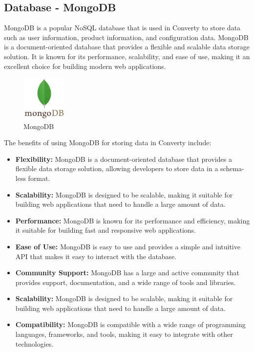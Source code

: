 \subsection{Database - MongoDB}
MongoDB is a popular NoSQL database that is used in Converty to store data such as user information, product information, and configuration data. MongoDB is a document-oriented database that provides a flexible and scalable data storage solution. It is known for its performance, scalability, and ease of use, making it an excellent choice for building modern web applications.

\begin{figure}[H]
    \centering
    \includegraphics[width=0.2\textwidth]{Images/mongodb2.png}
    \caption{MongoDB}
    \label{fig:mongodb}
\end{figure}

The benefits of using MongoDB for storing data in Converty include:

\begin{itemize}
    \item \textbf{Flexibility:} MongoDB is a document-oriented database that provides a flexible data storage solution, allowing developers to store data in a schema-less format.
    \item \textbf{Scalability:} MongoDB is designed to be scalable, making it suitable for building web applications that need to handle a large amount of data.
    \item \textbf{Performance:} MongoDB is known for its performance and efficiency, making it suitable for building fast and responsive web applications.
    \item \textbf{Ease of Use:} MongoDB is easy to use and provides a simple and intuitive API that makes it easy to interact with the database.
    \item \textbf{Community Support:} MongoDB has a large and active community that provides support, documentation, and a wide range of tools and libraries.
    \item \textbf{Scalability:} MongoDB is designed to be scalable, making it suitable for building web applications that need to handle a large amount of data.
    \item \textbf{Compatibility:} MongoDB is compatible with a wide range of programming languages, frameworks, and tools, making it easy to integrate with other technologies.
\end{itemize}

